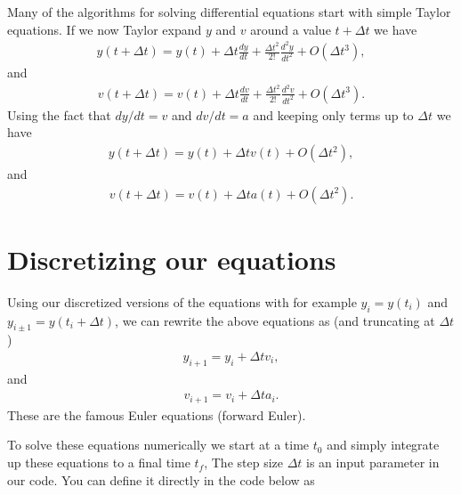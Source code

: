 \documentclass[letterpaper,10pt,english]{sphinxmanual}
\begin{document}
Many of the algorithms for solving differential equations start with simple Taylor equations.
If we now Taylor expand \(y\) and \(v\) around a value \(t+\Delta t\) we have
\begin{equation*}
\begin{split}
y(t+\Delta t) = y(t)+\Delta t \frac{dy}{dt}+\frac{\Delta t^2}{2!} \frac{d^2y}{dt^2}+O(\Delta t^3),
\end{split}
\end{equation*}
and
\begin{equation*}
\begin{split}
v(t+\Delta t) = v(t)+\Delta t \frac{dv}{dt}+\frac{\Delta t^2}{2!} \frac{d^2v}{dt^2}+O(\Delta t^3).
\end{split}
\end{equation*}
Using the fact that \(dy/dt = v\) and \(dv/dt=a\) and keeping only terms up to \(\Delta t\) we have
\begin{equation*}
\begin{split}
y(t+\Delta t) = y(t)+\Delta t v(t)+O(\Delta t^2),
\end{split}
\end{equation*}
and
\begin{equation*}
\begin{split}
v(t+\Delta t) = v(t)+\Delta t a(t)+O(\Delta t^2).
\end{split}
\end{equation*}

\section{Discretizing our equations}
\label{\detokenize{chapter1:discretizing-our-equations}}
Using our discretized versions of the equations with for example
\(y_{i}=y(t_i)\) and \(y_{i\pm 1}=y(t_i+\Delta t)\), we can rewrite the
above equations as (and truncating at \(\Delta t\))
\begin{equation*}
\begin{split}
y_{i+1} = y_i+\Delta t v_i,
\end{split}
\end{equation*}
and
\begin{equation*}
\begin{split}
v_{i+1} = v_i+\Delta t a_i.
\end{split}
\end{equation*}
These are the famous Euler equations (forward Euler).

To solve these equations numerically we start at a time \(t_0\) and simply integrate up these equations to a final time \(t_f\),
The step size \(\Delta t\) is an input  parameter in our code.
You can define it directly in the code below as
\end{document}
